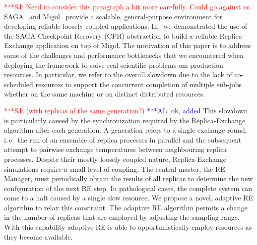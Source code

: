 \documentclass{rspublic}
\newcommand{\alnote}[1]{ {\textcolor{blue} { ***AL: #1 }}}
\newcommand{\jhanote}[1]{ {\textcolor{red} { ***SJ: #1 }}}
\newcommand{\alnote}[1]{}
\newcommand{\jhanote}[1]{}
\begin{document}
        
\jhanote{Need to consider this paragraph a bit more carefully. Could
  go against us.}         
SAGA~\citep{saga_gfd90} and Migol~\citep{schnorLuckow08} provide 
a scalable, general-purpose environment for developing reliable 
loosely coupled applications. In~\citet{Luckow:2008la} we demonstrated 
the use of the SAGA Checkpoint Recovery (CPR) abstraction to build a reliable
Replica-Exchange application on top of Migol.
The motivation of this paper is to address some of the challenges and 
performance bottlenecks that we encountered when deploying the 
framework to solve real scientific problems om production resources. 
In particular, we refer to the overall slowdown
due to the lack of co-scheduled resources to support the concurrent
completion of multiple sub-jobs whether on the same machine or on
distinct distributed resources. 

\jhanote{(with replicas of the same generation?)} \alnote{ok, added}
This slowdown is particularly caused by the synchronization required
by the Replica-Exchange algorithm after each generation. 
A generation refers to a single exchange round, i.\,e.\ the
run of an ensemble of replica processes in parallel and the subsequent attempt 
to pairwise exchange temperatures between neighbouring replica processes.
Despite their mostly loosely coupled nature, Replica-Exchange simulations require a
small level of coupling.  The central master, the RE-Manager, must
periodically obtain the results of all replicas to determine the new
configuration of the next RE step.  In pathological cases, the
complete system can come to a halt caused by a single slow
resource. We propose a novel, adaptive RE algorithm to relax this
constraint. The adaptive RE algorithm permits a change in the number
of replicas that are employed by adjusting the sampling range.  With
this capability adaptive RE is able to opportunistically employ
resources as they become available.
\end{document}
